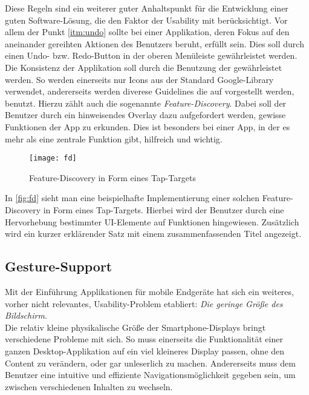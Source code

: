 Diese Regeln sind ein weiterer guter Anhaltspunkt für die Entwicklung einer guten Software-Lösung, die den Faktor der Usability mit berücksichtigt. Vor allem der Punkt \autoref{itm:undo} sollte bei einer Applikation, deren Fokus auf den aneinander gereihten Aktionen des Benutzers beruht, erfüllt sein. Dies soll durch einen Undo- bzw. Redo-Button in der oberen Menüleiste gewährleistet werden. \\

Die Konsistenz der Applikation soll durch die Benutzung der \citet{AndroidMG} gewährleistet werden. 
So werden einerseits nur Icons aus der Standard Google-Library verwendet, andererseits werden diverese Guidelines die auf \citet{AndroidMG} vorgestellt werden, benutzt. 
Hierzu zählt auch die sogenannte \emph{Feature-Discovery}.
Dabei soll der Benutzer durch ein hinweisendes Overlay dazu aufgefordert werden, gewisse Funktionen der App zu erkunden. 
Dies ist besonders bei einer App, in der es mehr als eine zentrale Funktion gibt, hilfreich und wichtig. \\

\begin{figure}[h]
    \centering
    \texttt{[image: fd]}
    \caption{Feature-Discovery in Form eines Tap-Targets}
    \label{fig:fd}
\end{figure}

In \autoref{fig:fd} sieht man eine beispielhafte Implementierung einer solchen Feature-Discovery in Form eines Tap-Targets.
Hierbei wird der Benutzer durch eine Hervorhebung bestimmter UI-Elemente auf Funktionen hingewiesen. 
Zusätzlich wird ein kurzer erklärender Satz mit einem zusammenfassenden Titel angezeigt. \\

\subsection{Gesture-Support}

Mit der Einführung Applikationen für mobile Endgeräte hat sich ein weiteres, vorher nicht relevantes, Usability-Problem etabliert: 
\emph{Die geringe Größe des Bildschirm}. \\

Die relativ kleine physikalische Größe der Smartphone-Displays bringt verschiedene Probleme mit sich. 
So muss einerseits die Funktionalität einer ganzen Desktop-Applikation auf ein viel kleineres Display passen, ohne den Content zu verändern, oder gar unleserlich zu machen.
Andererseits muss dem Benutzer eine intuitive und effiziente Navigationsmöglichkeit gegeben sein, um zwischen verschiedenen Inhalten zu wechseln. \\

